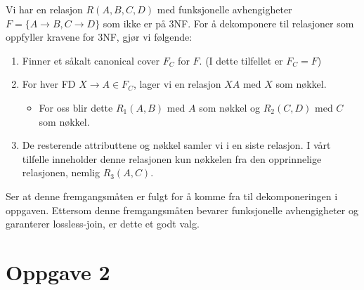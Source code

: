 \documentclass[a4paper, 12pt] {article}
\begin{document}
Vi har en relasjon $R(A,B,C,D)$ med funksjonelle avhengigheter $F = \{A \rightarrow B, C \rightarrow D\}$ som ikke er på 3NF. For å dekomponere til relasjoner som oppfyller kravene for 3NF, gjør vi følgende:

\begin{enumerate}
\item Finner et såkalt canonical cover $F_C$ for $F$. (I dette tilfellet er $F_C = F$)
\item For hver FD $X \rightarrow A \in F_C$, lager vi en relasjon $XA$ med $X$ som nøkkel.
    \begin{itemize}
    \item For oss blir dette $R_1(A,B)$ med $A$ som nøkkel og $R_2(C,D)$ med $C$ som nøkkel.
    \end{itemize}
\item De resterende attributtene og nøkkel samler vi i en siste relasjon. I vårt tilfelle inneholder denne relasjonen kun nøkkelen fra den opprinnelige relasjonen, nemlig $R_3(A,C)$.
\end{enumerate}

Ser at denne fremgangsmåten er fulgt for å komme fra til dekomponeringen i oppgaven. Ettersom denne fremgangsmåten bevarer funksjonelle avhengigheter og garanterer lossless-join, er dette et godt valg.

\section{Oppgave 2}

\newpage

\end{document}
